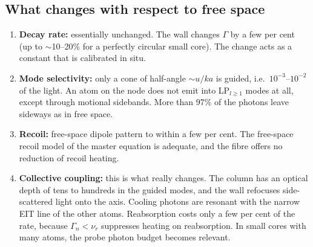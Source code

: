 \documentclass[11pt,a4paper]{article}
\begin{document}
\subsection{What changes with respect to free space}
\begin{enumerate}
\item \textbf{Decay rate:} essentially unchanged. The wall changes $\Gamma$ by a few per cent (up to $\sim$10--20\% for a perfectly circular small core). The change acts as a constant that is calibrated in situ.
\item \textbf{Mode selectivity:} only a cone of half-angle $\sim u/ka$ is guided, i.e.\ $10^{-3}$--$10^{-2}$ of the light. An atom on the node does not emit into LP$_{l\ge1}$ modes at all, except through motional sidebands. More than 97\% of the photons leave sideways as in free space.
\item \textbf{Recoil:} free-space dipole pattern to within a few per cent. The free-space recoil model of the master equation is adequate, and the fibre offers no reduction of recoil heating.
\item \textbf{Collective coupling:} this is what really changes. The column has an optical depth of tens to hundreds in the guided modes, and the wall refocuses side-scattered light onto the axis. Cooling photons are resonant with the narrow EIT line of the other atoms. Reabsorption costs only a few per cent of the rate, because $\Gamma_n<\nu_r$ suppresses heating on reabsorption. In small cores with many atoms, the probe photon budget becomes relevant.
\end{enumerate}

\end{document}
